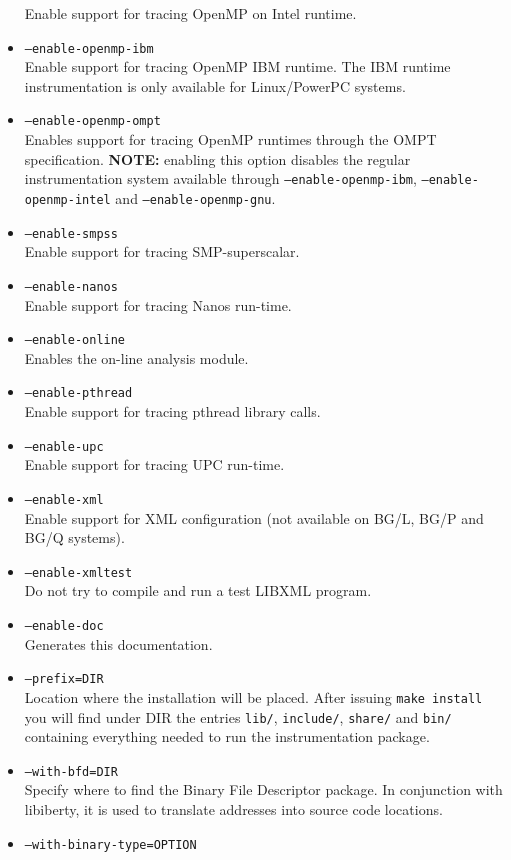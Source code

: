 \begin{itemize}
	Enable support for tracing OpenMP on Intel runtime.
	\item {\tt --enable-openmp-ibm} \\
	Enable support for tracing OpenMP IBM runtime. The IBM runtime instrumentation is only available for Linux/PowerPC systems.
    \item {\tt --enable-openmp-ompt} \\
    Enables support for tracing OpenMP runtimes through the OMPT specification. \textbf{NOTE:} enabling this option disables the regular instrumentation system available through \texttt{--enable-openmp-ibm}, \texttt{--enable-openmp-intel} and \texttt{--enable-openmp-gnu}.
	\item {\tt --enable-smpss} \\
	Enable support for tracing SMP-superscalar.
	\item {\tt --enable-nanos} \\
	Enable support for tracing Nanos run-time.
        \item {\tt --enable-online} \\
        Enables the on-line analysis module.
	\item {\tt --enable-pthread} \\
	Enable support for tracing pthread library calls.
	\item {\tt --enable-upc} \\
	Enable support for tracing UPC run-time.
	\item {\tt --enable-xml} \\
	Enable support for XML configuration (not available on BG/L, BG/P and BG/Q systems).
	\item {\tt --enable-xmltest} \\
	Do not try to compile and run a test LIBXML program.
	\item {\tt --enable-doc} \\
	Generates this documentation.
	\item {\tt --prefix=DIR} \\
	Location where the installation will be placed. After issuing {\tt make install} you will find under DIR the entries {\tt lib/}, {\tt include/}, {\tt share/} and {\tt bin/} containing everything needed to run the instrumentation package.
	\item {\tt --with-bfd=DIR} \\
	Specify where to find the Binary File Descriptor package. In conjunction with libiberty, it is used to translate addresses into source code locations.
	\item {\tt --with-binary-type=OPTION} \\

\end{itemize}
